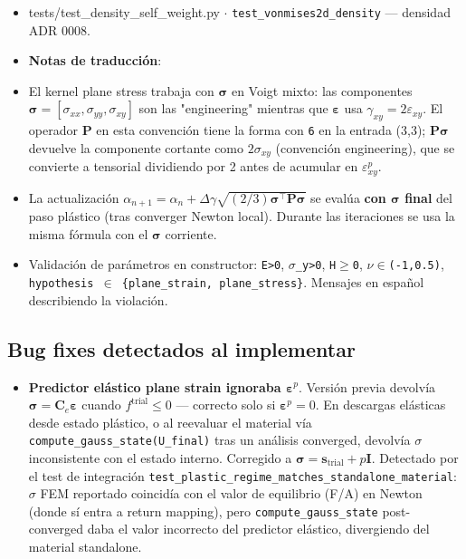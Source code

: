 \documentclass[11pt,letterpaper,oneside]{report}
\begin{document}
\begin{itemize}
  \item tests/test\_density\_self\_weight.py \ensuremath{\cdot} \texttt{test\_vonmises2d\_density} --- densidad ADR 0008.
  \item \textbf{Notas de traducción}:
  \item El kernel plane stress trabaja con $\boldsymbol\sigma$ en Voigt mixto: las componentes $\boldsymbol\sigma = [\sigma_{xx},\sigma_{yy},\sigma_{xy}]$ son las "engineering" mientras que $\boldsymbol\varepsilon$ usa $\gamma_{xy} = 2\varepsilon_{xy}$. El operador $\mathbf P$ en esta convención tiene la forma con \texttt{6} en la entrada (3,3); $\mathbf P\boldsymbol\sigma$ devuelve la componente cortante como $2\sigma_{xy}$ (convención engineering), que se convierte a tensorial dividiendo por 2 antes de acumular en $\varepsilon^p_{xy}$.
  \item La actualización $\alpha_{n+1} = \alpha_n + \Delta\gamma\sqrt{(2/3)\boldsymbol\sigma^\top\mathbf P\boldsymbol\sigma}$ se evalúa \textbf{con $\boldsymbol\sigma$ final} del paso plástico (tras converger Newton local). Durante las iteraciones se usa la misma fórmula con el $\boldsymbol\sigma$ corriente.
  \item Validación de parámetros en constructor: \texttt{E>0}, \texttt{\ensuremath{\sigma}\_y>0}, \texttt{H\ensuremath{\ge}0}, \texttt{\ensuremath{\nu}\ensuremath{\in}(-1,0.5)}, \texttt{hypothesis \ensuremath{\in} \{plane\_strain, plane\_stress\}}. Mensajes en español describiendo la violación.
\end{itemize}

\subsection{Bug fixes detectados al implementar}

\begin{itemize}
  \item \textbf{Predictor elástico plane strain ignoraba $\boldsymbol\varepsilon^p$}. Versión previa devolvía $\boldsymbol\sigma = \mathbf C_e\boldsymbol\varepsilon$ cuando $f^\text{trial} \leq 0$ --- correcto solo si $\boldsymbol\varepsilon^p = 0$. En descargas elásticas desde estado plástico, o al reevaluar el material vía \texttt{compute\_gauss\_state(U\_final)} tras un análisis converged, devolvía \ensuremath{\sigma} inconsistente con el estado interno. Corregido a $\boldsymbol\sigma = \mathbf s_\text{trial} + p\mathbf I$. Detectado por el test de integración \texttt{test\_plastic\_regime\_matches\_standalone\_material}: \ensuremath{\sigma} FEM reportado coincidía con el valor de equilibrio (F/A) en Newton (donde sí entra a return mapping), pero \texttt{compute\_gauss\_state} post-converged daba el valor incorrecto del predictor elástico, divergiendo del material standalone.
\end{itemize}
\end{document}
